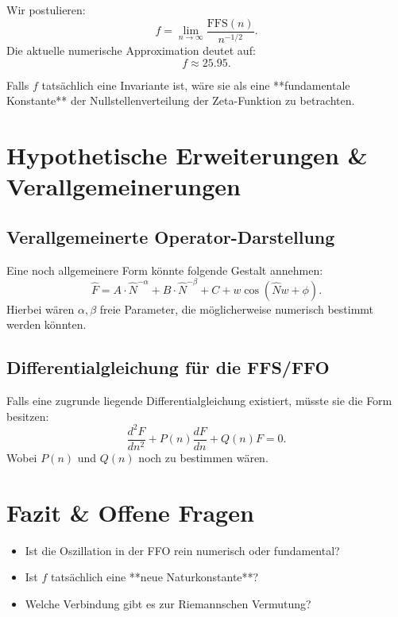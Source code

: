 \documentclass[a4paper,12pt]{article}
\begin{document}
Wir postulieren:
\begin{equation}
    f = \lim_{n \to \infty} \frac{\text{FFS}(n)}{n^{-1/2}}.
\end{equation}
Die aktuelle numerische Approximation deutet auf:
\begin{equation}
    f \approx 25.95.
\end{equation}

Falls $f$ tatsächlich eine Invariante ist, wäre sie als eine **fundamentale Konstante** der Nullstellenverteilung der Zeta-Funktion zu betrachten.

\section{Hypothetische Erweiterungen \& Verallgemeinerungen}
\subsection{Verallgemeinerte Operator-Darstellung}
Eine noch allgemeinere Form könnte folgende Gestalt annehmen:
\begin{equation}
    \hat{F} = A \cdot \hat{N}^{-\alpha} + B \cdot \hat{N}^{-\beta} + C + w \cos(\hat{N} w + \phi).
\end{equation}
Hierbei wären $\alpha, \beta$ freie Parameter, die möglicherweise numerisch bestimmt werden könnten.

\subsection{Differentialgleichung für die FFS/FFO}
Falls eine zugrunde liegende Differentialgleichung existiert, müsste sie die Form besitzen:
\begin{equation}
    \frac{d^2F}{dn^2} + P(n) \frac{dF}{dn} + Q(n) F = 0.
\end{equation}
Wobei $P(n)$ und $Q(n)$ noch zu bestimmen wären.

\section{Fazit \& Offene Fragen}
\begin{itemize}
    \item Ist die Oszillation in der FFO rein numerisch oder fundamental?
    \item Ist $f$ tatsächlich eine **neue Naturkonstante**?
    \item Welche Verbindung gibt es zur Riemannschen Vermutung?
\end{itemize}
\end{document}
